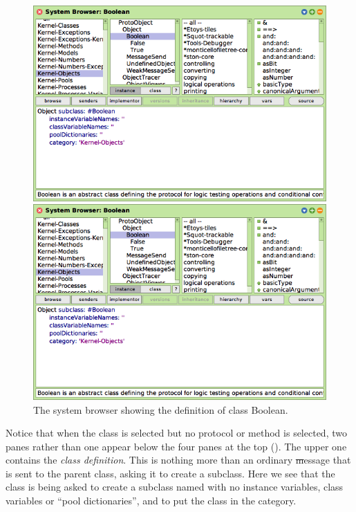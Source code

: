 \documentclass[a4paper,10pt,twoside]{book}
\begin{document}

\begin{figure}[hbt]
\ifluluelse
	{\centerline {\includegraphics[width=\textwidth]{Kernel-objects-boolean}}}
	{\centerline {\includegraphics[scale=0.7]{Kernel-objects-boolean}}}
\caption{The system browser showing the definition of class Boolean.
\label{fig:browseBoolean}}
\end{figure}

Notice that when the  class is selected but no protocol or method is selected, two panes rather than one appear below the four panes at the top
().
The upper one contains the \emph{class definition}.
This is nothing more than an ordinary \st message that is sent to the parent class, asking it to create a subclass.
Here we see that the class  is being asked to create a subclass named  with no instance variables, class variables or ``pool dictionaries'', and to put the class  in the  category.
\end{document}
